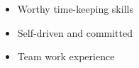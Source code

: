 %
%
%

\twocolumnsection
{
\begin{skills}
\end{skills}}
{
\vspace{1em}
\begin{itemize}
	\item Worthy time-keeping skills
	\item Self-driven and committed                  
    \item Team work experience
\end{itemize}
}


